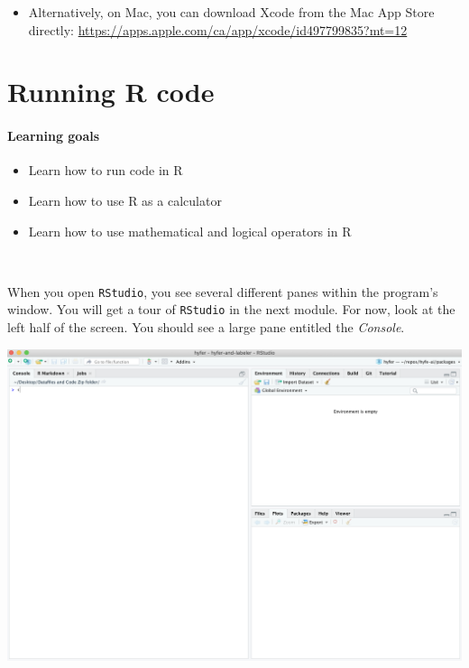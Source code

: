 \documentclass[
]{book}
\providecommand{\tightlist}{%
  \setlength{\itemsep}{0pt}\setlength{\parskip}{0pt}}
\begin{document}
\begin{itemize}
\tightlist
\item
  Alternatively, on Mac, you can download Xcode from the Mac App Store directly: \url{https://apps.apple.com/ca/app/xcode/id497799835?mt=12}
\end{itemize}

\hypertarget{running-r-code}{%
\chapter{Running R code}\label{running-r-code}}

\hypertarget{learning-goals}{%
\subsubsection*{Learning goals}\label{learning-goals}}

\begin{itemize}
\tightlist
\item
  Learn how to run code in R
\item
  Learn how to use R as a calculator
\item
  Learn how to use mathematical and logical operators in R
\end{itemize}

~

When you open \texttt{RStudio}, you see several different panes within the program's window. You will get a tour of \texttt{RStudio} in the next module. For now, look at the left half of the screen. You should see a large pane entitled the \emph{Console}.

\includegraphics{img/rstudio_firstopen.png}
\end{document}

